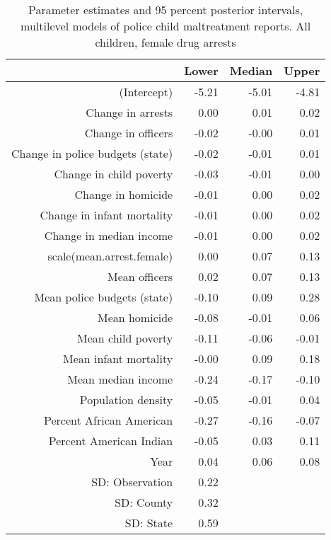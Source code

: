 \begin{table}[ht]
\centering
\begin{tabular}{rrrr}
  \hline
 & Lower & Median & Upper \\ 
  \hline
(Intercept) & -5.21 & -5.01 & -4.81 \\ 
  Change in arrests & 0.00 & 0.01 & 0.02 \\ 
  Change in officers & -0.02 & -0.00 & 0.01 \\ 
  Change in police budgets (state) & -0.02 & -0.01 & 0.01 \\ 
  Change in child poverty & -0.03 & -0.01 & 0.00 \\ 
  Change in homicide & -0.01 & 0.00 & 0.02 \\ 
  Change in infant mortality & -0.01 & 0.00 & 0.02 \\ 
  Change in median income & -0.01 & 0.00 & 0.02 \\ 
  scale(mean.arrest.female) & 0.00 & 0.07 & 0.13 \\ 
  Mean officers & 0.02 & 0.07 & 0.13 \\ 
  Mean police budgets (state) & -0.10 & 0.09 & 0.28 \\ 
  Mean homicide & -0.08 & -0.01 & 0.06 \\ 
  Mean child poverty & -0.11 & -0.06 & -0.01 \\ 
  Mean infant mortality & -0.00 & 0.09 & 0.18 \\ 
  Mean median income & -0.24 & -0.17 & -0.10 \\ 
  Population density & -0.05 & -0.01 & 0.04 \\ 
  Percent African American & -0.27 & -0.16 & -0.07 \\ 
  Percent American Indian & -0.05 & 0.03 & 0.11 \\ 
  Year & 0.04 & 0.06 & 0.08 \\ 
  SD: Observation & 0.22 &  &  \\ 
  SD: County & 0.32 &  &  \\ 
  SD: State & 0.59 &  &  \\ 
   \hline
\end{tabular}
\caption{Parameter estimates and 95 percent posterior intervals, multilevel models of 
             police child maltreatment reports. All children, female drug arrests} 
\end{table}
